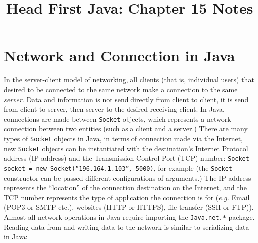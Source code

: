 \documentclass{tufte-handout}
\title{Head First Java: Chapter 15 Notes}
\begin{document}
    \maketitle

    \section*{Network and Connection in Java}
    In the server-client model of networking, all clients (that is, individual users) that desired to be connected to the same network make a connection to the same \emph{server}. Data and information is not send directly from client to client, it is send from client to server, then server to the desired receiving client. In Java, connections are made between \texttt{Socket} objects, which represents a network connection between two entities (such as a client and a server.) There are many types of \texttt{Socket} objects in Java, in terms of connection made via the Internet, new \texttt{Socket} objects can be instantiated with the destination's Internet Protocol address (IP address) and the Transmission Control Port (TCP) number: \texttt{Socket socket = new Socket(``196.164.1.103'', 5000)}, for example (the \texttt{Socket} constructor can be passed different configurations of arguments.) The IP address represents the ``location'' of the connection destination on the Internet, and the TCP number represents the type of application the connection is for (\textit{e.g.} Email (POP3 or SMTP etc.), websites (HTTP or HTTPS), file transfer (SSH or FTP)). Almost all network operations in Java require importing the \texttt{Java.net.*} package. Reading data from and writing data to the network is similar to serializing data in Java:
\end{document}
